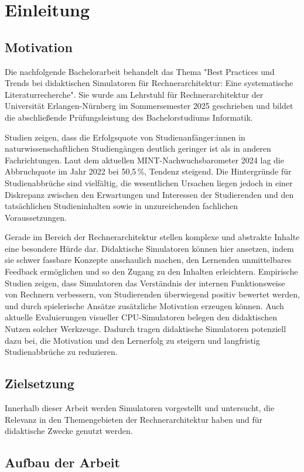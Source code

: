 \chapter{Einleitung}

\section{Motivation}

Die nachfolgende Bachelorarbeit behandelt das Thema "Best Practices und Trends bei didaktischen Simulatoren für Rechnerarchitektur: Eine systematische Literaturrecherche". Sie wurde am Lehrstuhl für Rechnerarchitektur der Universität Erlangen-Nürnberg im Sommersemester 2025 geschrieben und bildet die abschließende Prüfungsleistung des Bachelorstudiums Informatik.

Studien zeigen, dass die Erfolgsquote von Studienanfänger:innen in naturwissenschaftlichen Studiengängen deutlich geringer ist als in anderen Fachrichtungen.\parencite[S. 370]{burdinski_lehrvideos_2024} Laut dem aktuellen MINT-Nachwuchsbarometer 2024 lag die Abbruchquote im Jahr 2022 bei 50,5\,\%, Tendenz steigend. Die Hintergründe für Studienabbrüche sind vielfältig, die wesentlichen Ursachen liegen jedoch in einer Diskrepanz zwischen den Erwartungen und Interessen der Studierenden und den tatsächlichen Studieninhalten sowie in unzureichenden fachlichen Voraussetzungen.\parencite[S. 21]{joachim_herz_stiftung_mint_2024}

Gerade im Bereich der Rechnerarchitektur stellen komplexe und abstrakte Inhalte eine besondere Hürde dar. Didaktische Simulatoren können hier ansetzen, indem sie schwer fassbare Konzepte anschaulich machen, den Lernenden unmittelbares Feedback ermöglichen und so den Zugang zu den Inhalten erleichtern. Empirische Studien zeigen, dass Simulatoren das Verständnis der internen Funktionsweise von Rechnern verbessern,\parencite[S. 215]{prasad_using_2015} von Studierenden überwiegend positiv bewertet werden,\parencite[S. 8]{besim_understanding_2012} und durch spielerische Ansätze zusätzliche Motivation erzeugen können. Auch aktuelle Evaluierungen visueller CPU-Simulatoren belegen den didaktischen Nutzen solcher Werkzeuge. Dadurch tragen didaktische Simulatoren potenziell dazu bei, die Motivation und den Lernerfolg zu steigern und langfristig Studienabbrüche zu reduzieren.

\section{Zielsetzung}

Innerhalb dieser Arbeit werden Simulatoren vorgestellt und untersucht, die Relevanz in den Themengebieten der Rechnerarchitektur haben und für didaktische Zwecke genutzt werden.

\section{Aufbau der Arbeit}
